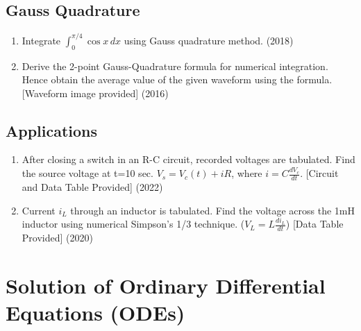 \documentclass[12pt, a4paper]{article}
\begin{document}
	\subsection{Gauss Quadrature}
	\begin{enumerate}
		\item Integrate $\int_0^{\pi/4} \cos x \,dx$ using Gauss quadrature method. (2018)
		\item Derive the 2-point Gauss-Quadrature formula for numerical integration. Hence obtain the average value of the given waveform using the formula. [Waveform image provided] (2016)
	\end{enumerate}
	
	\subsection{Applications}
	\begin{enumerate}
		\item After closing a switch in an R-C circuit, recorded voltages are tabulated. Find the source voltage at t=10 sec. $V_s = V_c(t) + iR$, where $i = C \frac{dV_c}{dt}$. [Circuit and Data Table Provided] (2022)
		\item Current $i_L$ through an inductor is tabulated. Find the voltage across the 1mH inductor using numerical Simpson's 1/3 technique. ($V_L = L \frac{di_L}{dt}$) [Data Table Provided] (2020)
	\end{enumerate}
	
	
	\section{Solution of Ordinary Differential Equations (ODEs)}
\end{document}
